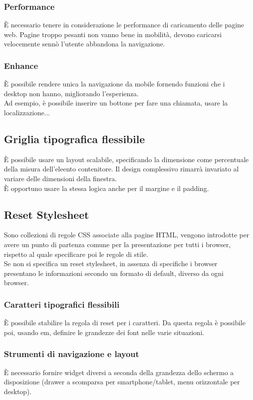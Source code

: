 \documentclass{article}
\begin{document}
\subsubsection{Performance}
È necessario tenere in considerazione le performance di caricamento delle pagine web. Pagine troppo pesanti non vanno bene in mobilità, devono caricarsi velocemente sennò l'utente abbandona la navigazione.
\subsubsection{Enhance}
È possibile rendere unica la navigazione da mobile fornendo funzioni che i desktop non hanno, migliorando l'esperienza.\\
Ad esempio, è possibile inserire un bottone per fare una chiamata, usare la localizzazione...
\subsection{Griglia tipografica flessibile}
È possibile usare un layout scalabile, specificando la dimensione come percentuale della misura dell'eleento contenitore. Il design complessivo rimarrà invariato al variare delle dimensioni della finestra.\\
È opportuno usare la stessa logica anche per il margine e il padding.
\subsection{Reset Stylesheet}
Sono collezioni di regole CSS associate alla pagine HTML, vengono introdotte per avere un punto di partenza comune per la presentazione per tutti i browser, rispetto al quale specificare poi le regole di stile.\\
Se non si specifica un reset stylesheet, in assenza di specifiche i browser presentano le informazioni secondo un formato di default, diverso da ogni browser.
\subsubsection{Caratteri tipografici flessibili}
È possibile stabilire la regola di reset per i caratteri. Da questa regola è possibile poi, usando em, definire le grandezze dei font nelle varie situazioni.
\subsubsection{Strumenti di navigazione e layout}
È necessario fornire widget diversi a seconda della grandezza dello schermo a disposizione (drawer a scomparsa per smartphone/tablet, menu orizzontale per desktop).
\end{document}
